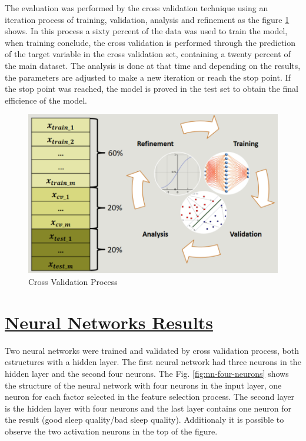 \documentclass[]{book}
\begin{document}
The evaluation was performed by the cross validation technique using an
iteration process of training, validation, analysis and refinement as
the figure \ref{fig:cross-validation-process} shows. In this process a
sixty percent of the data was used to train the model, when training
conclude, the cross validation is performed through the prediction of
the target variable in the cross validation set, containing a twenty
percent of the main dataset. The analysis is done at that time and
depending on the results, the parameters are adjusted to make a new
iteration or reach the stop point. If the stop point was reached, the
model is proved in the test set to obtain the final efficience of the
model.

\begin{figure}[H]

{\centering \includegraphics[width=0.8\linewidth]{images/cross-validation-process} 

}

\caption{Cross Validation Process}\label{fig:cross-validation-process}
\end{figure}

\hypertarget{neural-networks-results}{\section{\texorpdfstring{\protect\hyperlink{neural-networks-results}{Neural
Networks
Results}}{Neural Networks Results}}\label{neural-networks-results}}

Two neural networks were trained and validated by cross validation
process, both estructures with a hidden layer. The first neural network
had three neurons in the hidden layer and the second four neurons. The
Fig. \ref{fig:nn-four-neurons} shows the structure of the neural network
with four neurons in the input layer, one neuron for each factor
selected in the feature selection process. The second layer is the
hidden layer with four neurons and the last layer contains one neuron
for the result (good sleep quality/bad sleep quality). Additionaly it is
possible to observe the two activation neurons in the top of the figure.
\end{document}
